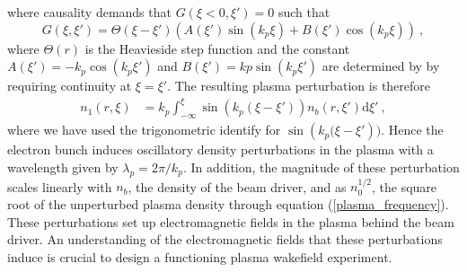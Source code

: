 where causality demands that $G\left(\xi<0 ,\xi'\right)=0$ such that
\begin{equation}
G\left(\xi,\xi'\right)=\Theta(\xi-\xi')\left(A(\xi')\sin\left(k_p\xi \right) + B(\xi')\cos\left(k_p\xi \right)\right) ~,
\end{equation}
where $\Theta(r)$ is the Heavieside step function and the constant $A(\xi')=-k_p\cos(k_p\xi')$ and $B(\xi')=kp\sin(k_p\xi')$ are determined by by requiring continuity at $\xi=\xi'$. The resulting plasma perturbation is therefore
\begin{equation}
\begin{aligned}
n_1\left(r,\xi \right)&=k_p\int_{-\infty}^{\xi}\sin\left(k_p(\xi-\xi')\right)n_b\left(r,\xi' \right) \mathrm{d}\xi'~,
\end{aligned}
\label{density_perturbation} 
\end{equation} %
where we have used the trigonometric identify for $\sin\left(k_p(\xi-\xi'\right))$. Hence the electron bunch induces oscillatory density perturbations in the plasma with a wavelength given by $\lambda_p=2\pi/k_p$. In addition, the magnitude of these perturbation scales linearly with $n_b$, the density of the beam driver, and as $n_0^{1/2}$, the square root of the unperturbed plasma density through equation (\ref{plasma_frequency}). These perturbations set up electromagnetic fields in the plasma behind the beam driver. An understanding of the electromagnetic fields that these perturbations induce is crucial to design a functioning plasma wakefield experiment.
